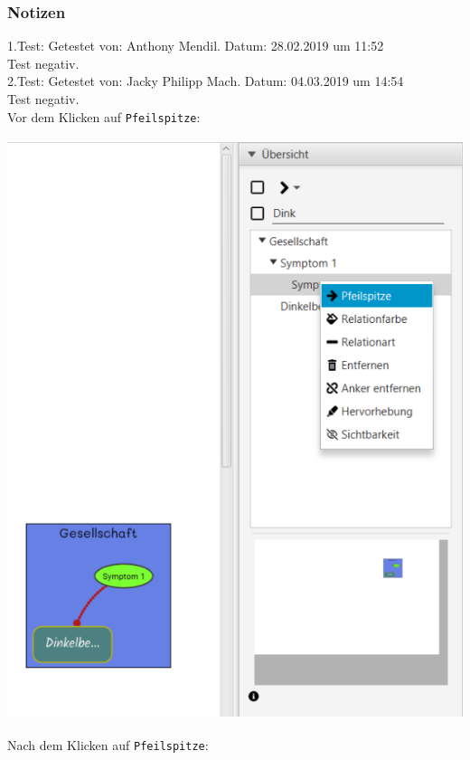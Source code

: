 \documentclass[enabledeprecatedfontcommands]{scrartcl}
\begin{document}
\subsubsection{Notizen}
1.Test: Getestet von: Anthony Mendil. Datum: 28.02.2019 um 11:52 \\
Test negativ.\\
2.Test: Getestet von: Jacky Philipp Mach. Datum: 04.03.2019 um 14:54 \\
Test negativ.\\
Vor dem Klicken auf \texttt{Pfeilspitze}:
\begin{center}
\includegraphics[height=17cm]{relationArtVorher.PNG}
\end{center}
Nach dem Klicken auf \texttt{Pfeilspitze}: 
\end{document}
